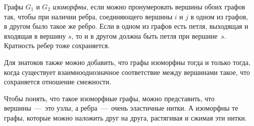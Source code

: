 \begin{definition}
	Графы $G_1$ и $G_2$ \emph{изоморфны}, если можно пронумеровать вершины обоих графов так, чтобы при наличии ребра, 
	соединяющего вершины $i$ и $j$ в одном из графов, в другом было такое же ребро. Если в одном из графов есть петля, 
	выходящая и входящая в вершину $s$, то и в другом должна быть петля при вершине~$s$. Кратность ребер тоже сохраняется.
\end{definition}

	Для знатоков также можно добавить, что графы изоморфны тогда и только тогда, когда существует взаимнооднозначное соответствие 
	между вершинами такое, что сохраняется отношение смежности.

	Чтобы понять, что такое изоморфные графы, можно представить, что вершины~---~это узлы, а ребра~---~очень эластичные нитки. 
	А изоморфны те графы, которые можно наложить друг на друга, растягивая и сжимая эти нитки.

